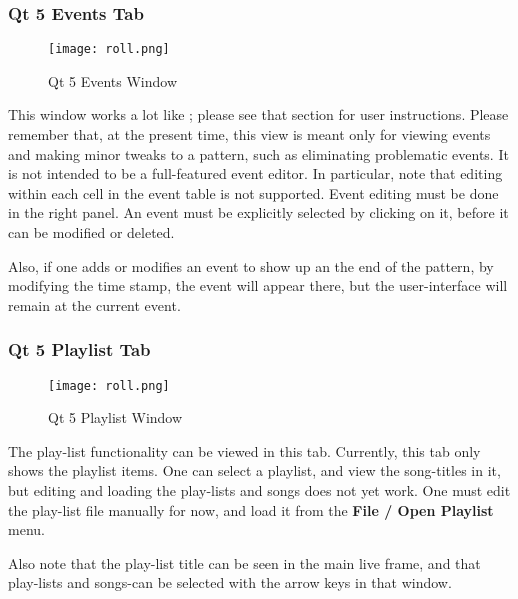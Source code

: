 \subsubsection{Qt 5 Events Tab}
\label{subsubsec:qt_portmidi_qt5_events_tab}

\begin{figure}[H]
   \centering 
   \texttt{[image: roll.png]}
   \caption{Qt 5 Events Window}
   \label{fig:qt5_events_window}
\end{figure}

   This window works a lot like ; please see
   that section for user instructions.  Please remember that, at the present
   time, this view is meant only for viewing events and making minor tweaks to
   a pattern, such as eliminating problematic events.  It is not intended to be
   a full-featured event editor.  In particular, note that editing within each
   cell in the event table is not supported.  Event editing must be done in the
   right panel.  An event must be explicitly selected by clicking on it, before
   it can be modified or deleted.

   Also, if one adds or modifies an event to show up an the end of the pattern,
   by modifying the time stamp, the event will appear there, but the
   user-interface will remain at the current event.

\subsubsection{Qt 5 Playlist Tab}
\label{subsubsec:qt_portmidi_qt5_playlist_tab}

\begin{figure}[H]
   \centering 
   \texttt{[image: roll.png]}
   \caption{Qt 5 Playlist Window}
   \label{fig:qt5_playlist_window}
\end{figure}

   The play-list functionality can be viewed in this tab.
   Currently, this tab only shows the playlist items.  One can
   select a playlist, and view the song-titles in it, but
   editing and loading the play-lists and songs does not yet
   work.  One must edit the play-list file manually for now,
   and load it from the \textbf{File / Open Playlist} menu.

   Also note that the play-list title can be seen in the main live frame, 
   and that play-lists and songs-can be selected with the arrow keys in that
   window.

